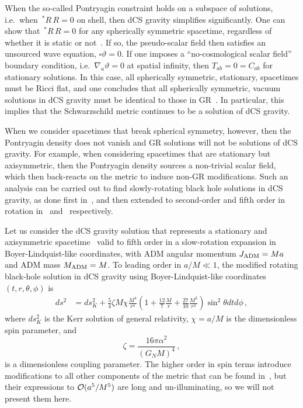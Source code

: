 \documentclass[prd,twocolumn,showpacs,superscriptaddress,nofootinbib]{revtex4-2}
\newcommand\be{\begin{equation}}
\newcommand\ee{\end{equation}}
\newcommand{\pont}{{\,^\ast\!}R\,R}
\begin{document}
When the so-called Pontryagin constraint holds on a subspace of solutions, i.e.~when $\pont=0$ on shell, then dCS gravity simplifies significantly. One can show that $\pont=0$ for any spherically symmetric spacetime, regardless of whether it is static or not~\cite{Grumiller:2007rv, Shiromizu:2013pna}. If so, the pseudo-scalar field then satisfies an unsourced wave equation, $\square \vartheta = 0$. If one imposes a ``no-cosmological scalar field'' boundary condition, i.e.~$\nabla_a \vartheta = 0$ at spatial infinity, then $T_{ab} = 0 = C_{ab}$ for stationary solutions. In this case, all spherically symmetric, stationary, spacetimes must be Ricci flat, and one concludes that all spherically symmetric, vacuum solutions in dCS gravity must be identical to those in GR~\cite{Grumiller:2007rv}. In particular, this implies that the Schwarzschild metric continues to be a solution of dCS gravity. 

When we consider spacetimes that break spherical symmetry, however, then the Pontryagin density does not vanish and GR solutions will not be solutions of dCS gravity. For example, when considering spacetimes that are stationary but axisymmetric, then the Pontryagin density sources a non-trivial scalar field, which then back-reacts on the metric to induce non-GR modifications. Such an analysis can be carried out to find slowly-rotating black hole solutions in dCS gravity, as done first in~\cite{Yunes:2009hc}, and then extended to second-order and fifth order in rotation in~\cite{Yagi:2012ya} and~\cite{Maselli:2017kic} respectively. 

Let us consider the dCS gravity solution that represents a stationary and axisymmetric spacetime~\cite{Yunes:2009hc,Yagi:2012ya,Maselli:2017kic} valid to fifth order in a slow-rotation expansion in Boyer-Lindquist-like coordinates, with ADM angular momentum $J_{\rm ADM} = M a$ and ADM mass $M_{\rm ADM} = M$. To leading order in $a/M \ll 1$, the modified rotating black-hole solution in dCS gravity using Boyer-Lindquist-like coordinates $(t,r,\theta,\phi)$ is
\begin{align}
ds^{2} \!&= \!ds^{2}_{K} \!+\! \frac{5}{4}\zeta M \chi \frac{M^4}{r^4} \left( 1+\frac{12}{7}\frac{M}{r} + \frac{27}{10} \frac{M^2}{r^2} \right) \sin^2\!\theta dt d\phi\,,
\label{metric-linear}
\end{align}
%
where $ds^{2}_{K}$ is the Kerr solution of general relativity, $\chi = a/M$ is the dimensionless spin parameter, and
\be
\zeta = \frac {16 \pi \alpha^2}{(G_N M)^4}\,,
\label{zeta}
\ee
is a dimensionless coupling parameter.
The higher order in spin terms introduce modifications to all other components of the metric that can be found in~\cite{Maselli:2017kic}, but their expressions to ${\cal{O}}(a^5/M^5)$ are long and un-illuminating, so we will not present them here.
\end{document}
